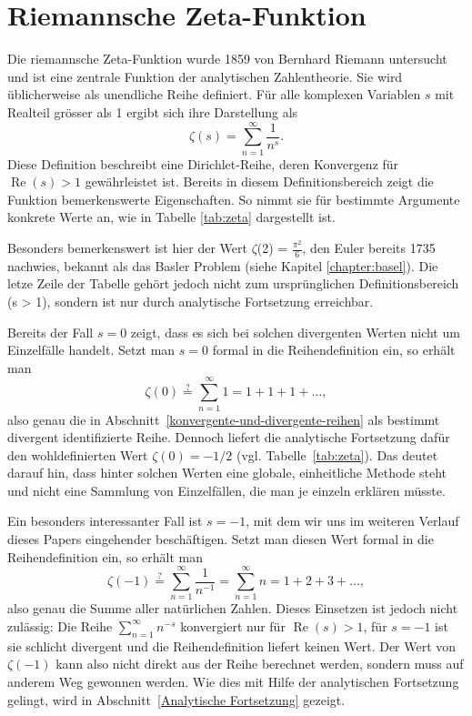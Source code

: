 %
%
%
%
\section{Riemannsche Zeta-Funktion}\label{Riemannsche Zeta-Funktion}

Die riemannsche Zeta-Funktion wurde 1859 von Bernhard Riemann untersucht und ist eine zentrale Funktion der
%
%
analytischen Zahlentheorie. Sie wird üblicherweise als unendliche Reihe
%
definiert. Für alle komplexen Variablen $s$ mit Realteil grösser als 1 ergibt sich ihre Darstellung als
\[
\zeta(s) = \sum_{n = 1}^{\infty}\frac{1}{n^{s}}.
\]
Diese Definition beschreibt eine Dirichlet-Reihe, deren Konvergenz für $\operatorname{Re}(s) > 1$ gewährleistet ist. 
Bereits in diesem Definitionsbereich zeigt die Funktion bemerkenswerte Eigenschaften. 
So nimmt sie für bestimmte Argumente konkrete Werte an, wie in Tabelle \ref{tab:zeta} dargestellt ist.



Besonders bemerkenswert ist hier der Wert $\zeta$(2) = $\frac{\pi^2}{6}$, den Euler bereits 1735 nachwies, bekannt als das Basler Problem (siehe Kapitel \ref{chapter:basel}).
%
%
Die letze Zeile der Tabelle gehört jedoch nicht zum ursprünglichen Definitionsbereich (s > 1), sondern ist nur durch analytische Fortsetzung erreichbar. 

Bereits der Fall $s = 0$ zeigt, dass es sich bei solchen divergenten Werten nicht um Einzelfälle handelt.
Setzt man $s = 0$ formal in die Reihendefinition ein, so erhält man
\[
\zeta(0) \overset{?}{=} \sum_{n=1}^{\infty} 1 = 1 + 1 + 1 + \ldots,
\]
also genau die in Abschnitt~\ref{konvergente-und-divergente-reihen} als bestimmt divergent identifizierte Reihe.
Dennoch liefert die analytische Fortsetzung dafür den wohldefinierten Wert $\zeta(0) = -1/2$ (vgl. Tabelle~\ref{tab:zeta}).
Das deutet darauf hin, dass hinter solchen Werten eine globale, einheitliche Methode steht und nicht eine Sammlung von Einzelfällen, die man je einzeln erklären müsste.

Ein besonders interessanter Fall ist $s = -1$, mit dem wir uns im weiteren Verlauf dieses Papers eingehender beschäftigen.
Setzt man diesen Wert formal in die Reihendefinition ein, so erhält man
\[
\zeta(-1) \overset{?}{=} \sum_{n=1}^{\infty} \frac{1}{n^{-1}} = \sum_{n=1}^{\infty} n = 1 + 2 + 3 + \ldots,
\]
also genau die Summe aller natürlichen Zahlen.
Dieses Einsetzen ist jedoch nicht zulässig: Die Reihe $\sum_{n=1}^{\infty} n^{-s}$ konvergiert nur für $\operatorname{Re}(s) > 1$, für $s = -1$ ist sie schlicht divergent und die Reihendefinition liefert keinen Wert.
Der Wert von $\zeta(-1)$ kann also nicht direkt aus der Reihe berechnet werden, sondern muss auf anderem Weg gewonnen werden.
Wie dies mit Hilfe der analytischen Fortsetzung gelingt, wird in Abschnitt~\ref{Analytische Fortsetzung} gezeigt.

